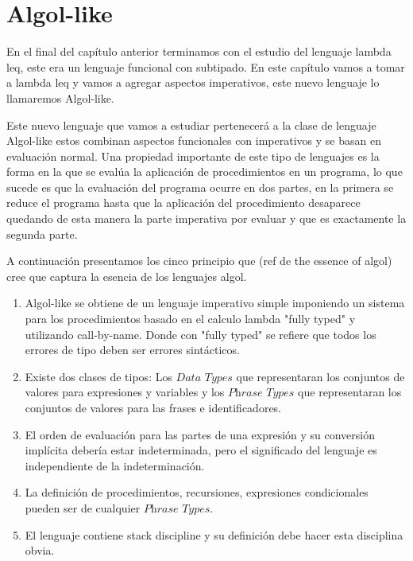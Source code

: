 \chapter{Algol-like}
\label{chap:algollike}

En el final del cap\'itulo anterior terminamos con el estudio
del lenguaje lambda leq, este era un lenguaje funcional con subtipado.
En este cap\'itulo vamos a tomar a lambda leq y vamos a agregar
aspectos imperativos, este nuevo lenguaje lo llamaremos Algol-like.

Este nuevo lenguaje que vamos a estudiar pertenecer\'a a la clase
de lenguaje Algol-like estos combinan
aspectos funcionales con imperativos y se basan en evaluaci\'on
normal. Una propiedad importante de este tipo de lenguajes es
la forma en la que se eval\'ua la aplicaci\'on de procedimientos
en un programa, lo que sucede es que la evaluaci\'on del programa
ocurre en dos partes, en la primera se reduce el programa hasta que
la aplicaci\'on del procedimiento desaparece quedando de esta manera 
la parte imperativa por evaluar y que es exactamente la segunda parte.

A continuaci\'on presentamos los cinco principio que (ref de the essence of algol)
cree que captura la esencia de los lenguajes algol.

\begin{enumerate}
\item Algol-like se obtiene de un lenguaje imperativo simple imponiendo un
sistema para los procedimientos basado en el calculo lambda "fully typed" y utilizando
call-by-name. Donde con "fully typed" se refiere que todos los errores de tipo deben ser
errores sint\'acticos.

\item Existe dos clases de tipos: Los $\textit{Data Types}$ que representaran los 
conjuntos de valores para expresiones y variables y los $\textit{Phrase Types}$ que
representaran los conjuntos de valores para las frases e identificadores.

\item El orden de evaluaci\'on para las partes de una expresi\'on y su
conversi\'on impl\'icita deber\'ia estar indeterminada, pero el significado
del lenguaje es independiente de la indeterminaci\'on.

\item La definici\'on de procedimientos, recursiones, expresiones condicionales
pueden ser de cualquier $\textit{Phrase Types}$.

\item El lenguaje contiene stack discipline y su definici\'on debe hacer esta disciplina
obvia.

\end{enumerate}

